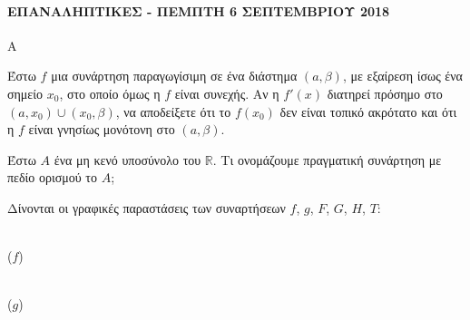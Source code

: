 \paragraph{ΕΠΑΝΑΛΗΠΤΙΚΕΣ - ΠΕΜΠΤΗ 6 ΣΕΠΤΕΜΒΡΙΟΥ 2018}
\newcommand{\axesgraph}[1]{%
  \draw[-latex] (-1.3,0) -- (1.5,0) node[right,font=\tiny] {$x$};
  \draw[-latex] (0,-1.3) -- (0,1.8) node[above,font=\tiny] {$y$};
  \node[font=\tiny] at (-1.3,0.15) {$x'$};
  \node[font=\tiny] at (0.1,-1.2) {$y'$};
  #1
}

\begin{thema}{Α}
\begin{erwthma}
    \item Έστω $f$ μια συνάρτηση παραγωγίσιμη σε ένα διάστημα $(a, \beta)$, με εξαίρεση ίσως ένα σημείο $x_0$, στο οποίο όμως η $f$ είναι συνεχής. Αν η $f'(x)$ διατηρεί πρόσημο στο $(a, x_0) \cup (x_0, \beta)$, να αποδείξετε ότι το $f(x_0)$ δεν είναι τοπικό ακρότατο και ότι η $f$ είναι γνησίως μονότονη στο $(a, \beta)$. 
    \item Έστω $A$ ένα μη κενό υποσύνολο του $\mathbb{R}$. Τι ονομάζουμε πραγματική συνάρτηση με πεδίο ορισμού το $A$; 
    \item Δίνονται οι γραφικές παραστάσεις των συναρτήσεων $f$, $g$, $F$, $G$, $H$, $T$:

\vspace{6pt}
\noindent
\begin{minipage}[t]{0.48\textwidth}
\centering
{}\\[2pt]
\small{($f$)}
\end{minipage}
\hfill
\begin{minipage}[t]{0.48\textwidth}
\centering
{}\\[2pt]
\small{($g$)}
\end{minipage}


\end{erwthma}
\end{thema}
